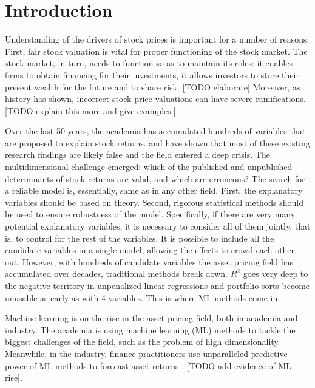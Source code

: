 \chapter{Introduction}
\label{chap:int}

Understanding of the drivers of stock prices is important for a number of reasons. First, fair stock valuation is vital for proper functioning of the stock market. The stock market, in turn, needs to function so as to maintain its roles: it enables firms to obtain financing for their investments, it allows investors to store their present wealth for the future and to share risk. [TODO elaborate] Moreover, as history has shown, incorrect stock price valuations can have severe ramifications. [TODO explain this more and give examples.]

Over the last 50 years, the academia has accumulated hundreds of variables that are proposed to explain stock returns. \cite{harvey2016and} and \cite{mclean2016does} have shown that most of these existing research findings are likely false and the field entered a deep crisis. The multidimensional challenge \citep{cochrane2011presidential} emerged: which of the published and unpublished determinants of stock returns are valid, and which are erroneous? The search for a reliable model is, essentially, same as in any other field. First, the explanatory variables should be based on theory. Second, rigorous statistical methods should be used to ensure robustness of the model. Specifically, if there are very many potential explanatory variables, it is necessary to consider all of them jointly, that is, to control for the rest of the variables. It is possible to include all the candidate variables in a single model, allowing the effects to crowd each other out. However, with hundreds of candidate variables the asset pricing field has accumulated over decades, traditional methods break down. $R^2$ goes very deep to the negative territory in unpenalized linear regressions \citep{gu2020empirical} and portfolio-sorts become unusable as early as with 4 variables. This is where ML methods come in. 

Machine learning is on the rise in the asset pricing field, both in academia and industry. The academia is using machine learning (ML) methods to tackle the biggest challenges of the field, such as the problem of high dimensionality. Meanwhile, in the industry, finance practitioners use unparalleled predictive power of ML methods to forecast asset returns \citep{gu2020empirical}. [TODO add evidence of ML rise].    

